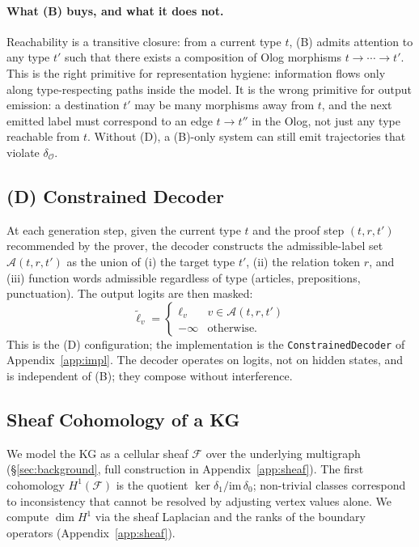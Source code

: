 \paragraph{What (B) buys, and what it does not.} Reachability is a
transitive closure: from a current type $t$, (B) admits attention to any
type $t'$ such that there exists a composition of Olog morphisms
$t \to \cdots \to t'$. This is the right primitive for representation
hygiene: information flows only along type-respecting paths inside the
model. It is the wrong primitive for output emission: a destination
$t'$ may be many morphisms away from $t$, and the next emitted label
must correspond to an edge $t \to t''$ in the Olog, not just any type
reachable from $t$. Without (D), a (B)-only system can still emit
trajectories that violate $\delta_\mathcal{O}$.

\subsection{(D) Constrained Decoder}
\label{sec:method:decoder}

At each generation step, given the current type $t$ and the proof step
$(t, r, t')$ recommended by the prover, the decoder constructs the
admissible-label set $\mathcal{A}(t, r, t')$ as the union of (i) the
target type $t'$, (ii) the relation token $r$, and (iii) function words
admissible regardless of type (articles, prepositions, punctuation). The
output logits are then masked:
\begin{equation}
\tilde{\ell}_v = \begin{cases}
\ell_v & v \in \mathcal{A}(t, r, t') \\
-\infty & \text{otherwise.}
\end{cases}
\end{equation}
This is the (D) configuration; the implementation is the
\texttt{ConstrainedDecoder} of Appendix~\ref{app:impl}. The decoder
operates on logits, not on hidden states, and is independent of (B);
they compose without interference.

\subsection{Sheaf Cohomology of a KG}
\label{sec:method:sheaf}

We model the KG as a cellular sheaf $\mathcal{F}$ over the underlying
multigraph (\S\ref{sec:background}, full construction in
Appendix~\ref{app:sheaf}). The first cohomology $H^1(\mathcal{F})$ is the
quotient $\ker \delta_1 / \mathrm{im}\,\delta_0$; non-trivial classes
correspond to inconsistency that cannot be resolved by adjusting vertex
values alone. We compute $\dim H^1$ via the sheaf Laplacian and the
ranks of the boundary operators (Appendix~\ref{app:sheaf}).

